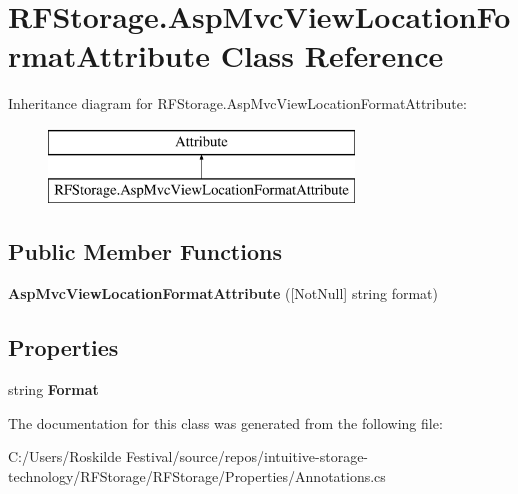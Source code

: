 \section{R\+F\+Storage.\+Asp\+Mvc\+View\+Location\+Format\+Attribute Class Reference}
\label{class_r_f_storage_1_1_asp_mvc_view_location_format_attribute}
Inheritance diagram for R\+F\+Storage.\+Asp\+Mvc\+View\+Location\+Format\+Attribute\+:\begin{figure}[H]
\begin{center}
\leavevmode
\includegraphics[height=2.000000cm]{class_r_f_storage_1_1_asp_mvc_view_location_format_attribute}
\end{center}
\end{figure}
\subsection*{Public Member Functions}
\begin{DoxyCompactItemize}
\item 
\mbox{\label{class_r_f_storage_1_1_asp_mvc_view_location_format_attribute_aa963f0de8f83635ceb52b5f106e9ab3b}} 
{\bfseries Asp\+Mvc\+View\+Location\+Format\+Attribute} ([Not\+Null] string format)
\end{DoxyCompactItemize}
\subsection*{Properties}
\begin{DoxyCompactItemize}
\item 
\mbox{\label{class_r_f_storage_1_1_asp_mvc_view_location_format_attribute_a4f992fb22e935580f754aed601b71d96}} 
string {\bfseries Format}\hspace{0.3cm}{\ttfamily  [get]}
\end{DoxyCompactItemize}


The documentation for this class was generated from the following file\+:\begin{DoxyCompactItemize}
\item 
C\+:/\+Users/\+Roskilde Festival/source/repos/intuitive-\/storage-\/technology/\+R\+F\+Storage/\+R\+F\+Storage/\+Properties/Annotations.\+cs\end{DoxyCompactItemize}
